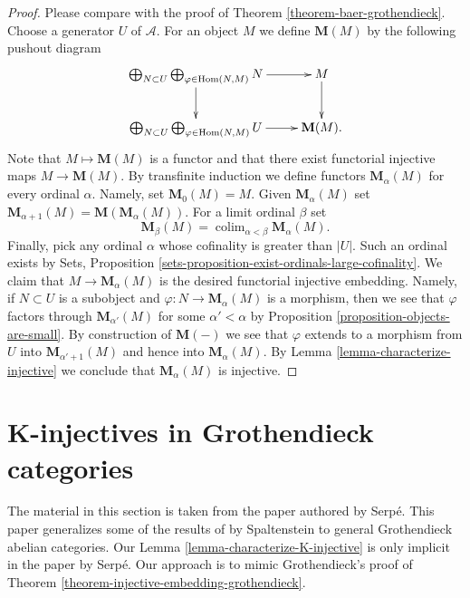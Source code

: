 \documentclass{stacks-project}
\theoremstyle{plain}
\theoremstyle{definition}
\theoremstyle{remark}
\numberwithin{equation}{subsection}
\def\colim{\mathop{\mathrm{colim}}\nolimits}
\def\Hom{\mathop{\mathrm{Hom}}\nolimits}
\begin{document}
\begin{proof}
Please compare with the proof of
Theorem \ref{theorem-baer-grothendieck}.
Choose a generator $U$ of $\mathcal{A}$. For an object $M$ we define
$\mathbf{M}(M)$ by the following pushout diagram
$$
\xymatrix{
\bigoplus_{N \subset U}
\bigoplus_{\varphi \in \Hom(N, M)}
N \ar[r] \ar[d] & M \ar[d] \\
\bigoplus_{N \subset U}
\bigoplus_{\varphi \in \Hom(N, M)}
U \ar[r] &  \mathbf{M}(M).
}
$$
Note that $M \mapsto \mathbf{M}(M)$ is a functor and that there
exist functorial injective maps $M \to \mathbf{M}(M)$. By transfinite
induction we define functors $\mathbf{M}_\alpha(M)$ for every
ordinal $\alpha$. Namely, set $\mathbf{M}_0(M) = M$. Given
$\mathbf{M}_\alpha(M)$ set
$\mathbf{M}_{\alpha + 1}(M) = \mathbf{M}(\mathbf{M}_\alpha(M))$.
For a limit ordinal $\beta$ set
$$
\mathbf{M}_\beta(M) = \colim_{\alpha < \beta} \mathbf{M}_\alpha(M).
$$
Finally, pick any ordinal $\alpha$ whose cofinality is greater than $|U|$.
Such an ordinal exists by
Sets, Proposition \ref{sets-proposition-exist-ordinals-large-cofinality}.
We claim that $M \to \mathbf{M}_\alpha(M)$ is the desired functorial
injective embedding. Namely, if $N \subset U$ is a subobject and
$\varphi : N \to \mathbf{M}_\alpha(M)$ is a morphism, then we see that
$\varphi$ factors through $\mathbf{M}_{\alpha'}(M)$ for some
$\alpha' < \alpha$ by
Proposition \ref{proposition-objects-are-small}.
By construction of $\mathbf{M}(-)$ we see that $\varphi$ extends to
a morphism from $U$ into $\mathbf{M}_{\alpha' + 1}(M)$ and hence into
$\mathbf{M}_\alpha(M)$. By
Lemma \ref{lemma-characterize-injective}
we conclude that $\mathbf{M}_\alpha(M)$ is injective.
\end{proof}













\section{K-injectives in Grothendieck categories}
\label{section-K-injective}

\noindent
The material in this section is taken from the paper \cite{serpe}
authored by Serp\'e. This paper generalizes some of the results
of \cite{Spaltenstein} by Spaltenstein to general Grothendieck abelian
categories. Our Lemma \ref{lemma-characterize-K-injective}
is only implicit in the paper by Serp\'e. Our approach is to mimic
Grothendieck's proof of
Theorem \ref{theorem-injective-embedding-grothendieck}.
\end{document}
